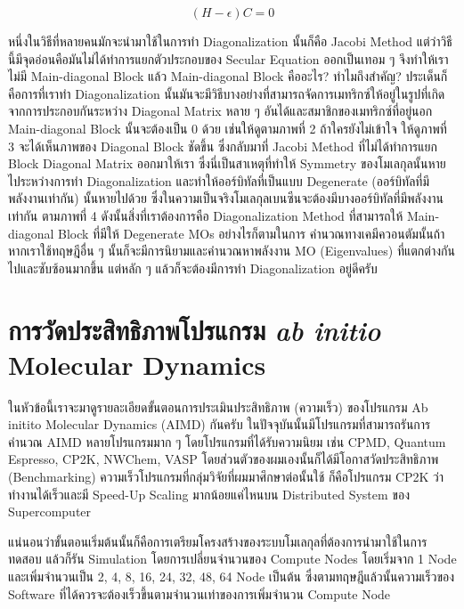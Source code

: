 \begin{equation}
  (H - \epsilon)C = 0
\end{equation}

หนึ่งในวิธีที่หลายคนมักจะนำมาใช้ในการทำ Diagonalization นั้นก็คือ Jacobi Method แต่ว่าวิธีนี้มีจุดอ่อนคือมันไม่ได้ทำการแยกตัวประกอบของ
Secular Equation ออกเป็นเทอม ๆ จึงทำให้เราไม่มี Main-diagonal Block แล้ว Main-diagonal Block คืออะไร? ทำไมถึงสำคัญ?
ประเด็นก็คือการที่เราทำ Diagonalization นั้นมันจะมีวิธีบางอย่างที่สามารถจัดการเมทริกซ์ให้อยู่ในรูปที่เกิดจากการประกอบกันระหว่าง Diagonal
Matrix หลาย ๆ อันได้และสมาชิกของเมทริกซ์ที่อยู่นอก Main-diagonal Block นั้นจะต้องเป็น 0 ด้วย เช่นให้ดูตามภาพที่ 2 ถ้าใครยังไม่เข้าใจ%
ให้ดูภาพที่ 3 จะได้เห็นภาพของ Diagonal Block ชัดขึ้น ซึ่งกลับมาที่ Jacobi Method ที่ไม่ได้ทำการแยก Block Diagonal Matrix
ออกมาให้เรา ซึ่งนี่เป็นสาเหตุที่ทำให้ Symmetry ของโมเลกุลนั้นหายไประหว่างการทำ Diagonalization และทำให้ออร์บิทัลที่เป็นแบบ Degenerate
(ออร์บิทัลที่มีพลังงานเท่ากัน) นั้นหายไปด้วย ซึ่งในความเป็นจริงโมเลกุลเบนซีนจะต้องมีบางออร์บิทัลที่มีพลังงานเท่ากัน ตามภาพที่ 4
ดังนั้นสิ่งที่เราต้องการคือ Diagonalization Method ที่สามารถให้ Main-diagonal Block ที่มีให้ Degenerate MOs อย่างไรก็ตามในการ%
คำนวณทางเคมีควอนตัมนั้นถ้าหากเราใช้ทฤษฎีอื่น ๆ นั้นก็จะมีการนิยามและคำนวณหาพลังงาน MO (Eigenvalues) ที่แตกต่างกันไปและซับซ้อนมากขึ้น
แต่หลัก ๆ แล้วก็จะต้องมีการทำ Diagonalization อยู่ดีครับ

\section{การวัดประสิทธิภาพโปรแกรม \textit{ab initio} Molecular Dynamics}

ในหัวข้อนี้เราจะมาดูรายละเอียดขั้นตอนการประเมินประสิทธิภาพ (ความเร็ว) ของโปรแกรม Ab initito Molecular Dynamics (AIMD) กันครับ
ในปัจจุบันนั้นมีโปรแกรมที่สามารถรันการคำนวณ AIMD หลายโปรแกรมมาก ๆ โดยโปรแกรมที่ได้รับความนิยม เช่น CPMD, Quantum Espresso,
CP2K, NWChem, VASP โดยส่วนตัวของผมเองนั้นก็ได้มีโอกาสวัดประสิทธิภาพ (Benchmarking) ความเร็วโปรแกรมที่กลุ่มวิจัยที่ผมมาศึกษาต่อนั้นใช้
ก็คือโปรแกรม CP2K ว่าทำงานได้เร็วและมี Speed-Up Scaling มากน้อยแค่ไหนบน Distributed System ของ Supercomputer

แน่นอนว่าขั้นตอนเริ่มต้นนั้นก็คือการเตรียมโครงสร้างของระบบโมเลกุลที่ต้องการนำมาใช้ในการทดสอบ แล้วก็รัน Simulation โดยการเปลี่ยนจำนวนของ
Compute Nodes โดยเริ่มจาก 1 Node และเพิ่มจำนวนเป็น 2, 4, 8, 16, 24, 32, 48, 64 Node เป็นต้น ซึ่งตามทฤษฎีแล้วนั้นความเร็วของ
Software ที่ได้ควรจะต้องเร็วขึ้นตามจำนวนเท่าของการเพิ่มจำนวน Compute Node

